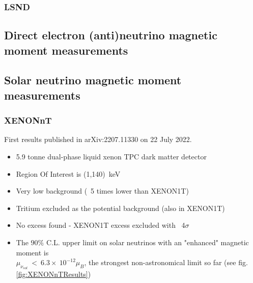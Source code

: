 \subsubsection{LSND}

\subsection{Direct electron (anti)neutrino magnetic moment measurements}

\subsection{Solar neutrino magnetic moment measurements}
\subsubsection{XENONnT}
First results published in arXiv:2207.11330\cite{XENONnTFirstResults2022_OfficialPaper.pdf} on 22 July 2022.
\begin{itemize}
    \item 5.9 tonne dual-phase liquid xenon TPC dark matter detector
    \item Region Of Interest is (1,140)~keV
    \item Very low background (~5 times lower than XENON1T)
    \item Tritium excluded as the potential background (also in XENON1T)
    \item No excess found - XENON1T excess excluded with ~4$\sigma$
    \item The $90\%$ C.L. upper limit on solar neutrinos with an "enhanced" magnetic moment is \\$\mu_{\nu_{sol}}~<~6.3\times~10^{-12}\mu_B$, the strongest non-astronomical limit so far (see fig.\ref{fig:XENONnTResults})
\end{itemize}

